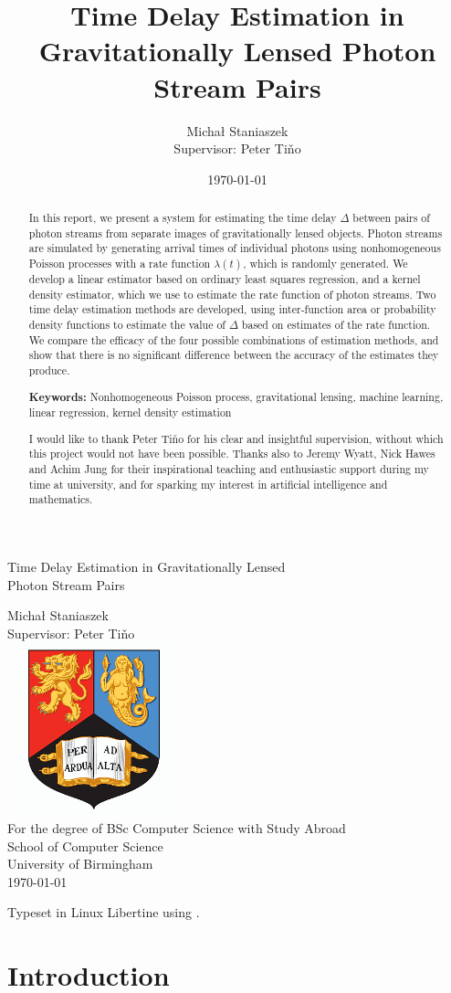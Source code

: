 \documentclass[a4paper,11pt]{article}
\title{Time Delay Estimation in Gravitationally Lensed Photon Stream Pairs}
\author{\Large{Micha{\l} Staniaszek} \\\small{Supervisor: Peter Ti{\v{n}}o}}
\date{\today}
\renewcommand{\maketitle}
{\begin{titlepage}
\begin{spacing}{1} 
\begin{large}
\begin{center}
\mbox{}
\vfill
\begin{sc}
Time Delay Estimation in Gravitationally Lensed\\ Photon Stream Pairs\\
\end{sc}
\vspace*{15mm}
Micha{\l} Staniaszek\\
Supervisor: Peter Ti{\v{n}}o\\
\vspace*{4mm}
\includegraphics[width=50mm,height=50mm]{crest.png}\\
For the degree of BSc Computer Science with Study Abroad\\
School of Computer Science\\
University of Birmingham\\
\vspace*{10mm}
\today
\vfill
\vspace*{.2in}
\end{center}
\end{large}
\end{spacing}
\end{titlepage}
}%
\begin{document}
\maketitle



\begin{abstract}
\noindent In this report, we present a system for estimating the time delay
$\Delta$ between pairs of photon streams from separate images of gravitationally
lensed objects. Photon streams are simulated by generating arrival times of
individual photons using nonhomogeneous Poisson processes with a rate function
$\lambda(t)$, which is randomly generated. We develop a linear estimator based
on ordinary least squares regression, and a kernel density estimator, which we
use to estimate the rate function of photon streams. Two time delay estimation
methods are developed, using inter-function area or probability density
functions to estimate the value of $\Delta$ based on estimates of the rate
function. We compare the efficacy of the four possible combinations of
estimation methods, and show that there is no significant difference between the
accuracy of the estimates they produce.

\vspace{1.0cm}\noindent\textbf{Keywords:} Nonhomogeneous Poisson process, gravitational lensing,
machine learning, linear regression, kernel density estimation
\end{abstract}

\vspace{2.0cm}\renewcommand{\abstractname}{Acknowledgements}
\begin{abstract}
 \noindent I would like to thank Peter Ti{\v{n}}o for his clear and insightful
supervision, without which this project would not have been possible. Thanks
also to Jeremy Wyatt, Nick Hawes and Achim Jung for their inspirational teaching
and enthusiastic support during my time at university, and for
sparking my interest in artificial intelligence and mathematics.
\end{abstract}

\begin{center}
\vspace*{\fill}\scriptsize{Typeset in Linux Libertine using \XeLaTeX}.
\end{center}

\newpage
\tableofcontents
\newpage
{}
\section{Introduction}
\label{sec-1}
\end{document}
